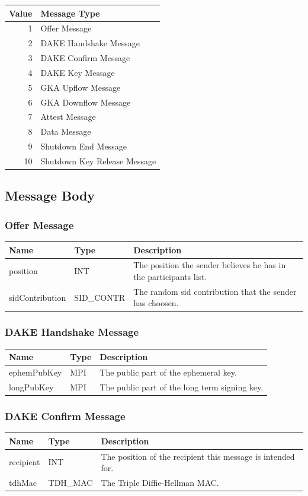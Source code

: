 \documentclass[12pt,titlepage,a4paper]{article}
\begin{document}
\begin{tabular}{r l}
Value & Message Type \\
\hline
1 & Offer Message \\
2 & DAKE Handshake Message \\
3 & DAKE Confirm Message \\
4 & DAKE Key Message \\
5 & GKA Upflow Message \\
6 & GKA Downflow Message \\
7 & Attest Message \\
8 & Data Message \\
9 & Shutdown End Message \\
10 & Shutdown Key Release Message \\
\end{tabular}

\subsection{Message Body}

\subsubsection{Offer Message}
\begin{tabular}{l l l}
Name            & Type       & Description \\
\hline
position        & INT        & The position the sender believes he has in the participants list. \\
sidContribution & SID\_CONTR & The random sid contribution that the sender has choosen. \\
\end{tabular}


\subsubsection{DAKE Handshake Message}
\begin{tabular}{l l l}
Name        & Type      & Description \\
\hline
ephemPubKey & MPI       & The public part of the ephemeral key. \\
longPubKey  & MPI       & The public part of the long term signing key. \\
\end{tabular}

\subsubsection{DAKE Confirm Message}
\begin{tabular}{l l l}
Name        & Type      & Description \\
\hline
recipient   & INT       & The position of the recipient this message is intended for. \\
tdhMac      & TDH\_MAC  & The Triple Diffie-Hellman MAC. \\
\end{tabular}
\end{document}
